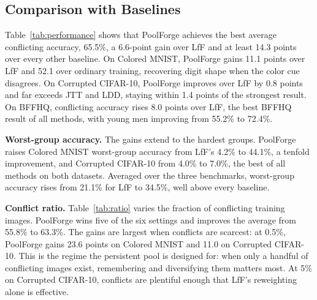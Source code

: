 \documentclass[10pt,twocolumn,letterpaper]{article}
\begin{document}
\subsection{Comparison with Baselines}

Table~\ref{tab:performance} shows that PoolForge achieves the best average conflicting accuracy, 65.5\%, a 6.6-point gain over LfF and at least 14.3 points over every other baseline. On Colored MNIST, PoolForge gains 11.1 points over LfF and 52.1 over ordinary training, recovering digit shape when the color cue disagrees. On Corrupted CIFAR-10, PoolForge improves over LfF by 0.8 points and far exceeds JTT and LDD, staying within 1.4 points of the strongest result. On BFFHQ, conflicting accuracy rises 8.0 points over LfF, the best BFFHQ result of all methods, with young men improving from 55.2\% to 72.4\%.

\begin{table}[t]
\centering\small\setlength{\tabcolsep}{3pt}

\caption{Conflicting accuracy (\%) per method and dataset. Higher is better. LDD uses its own backbone and training budget.}
\label{tab:performance}
\end{table}

\textbf{Worst-group accuracy.} The gains extend to the hardest groups. PoolForge raises Colored MNIST worst-group accuracy from LfF's 4.2\% to 44.1\%, a tenfold improvement, and Corrupted CIFAR-10 from 4.0\% to 7.0\%, the best of all methods on both datasets. Averaged over the three benchmarks, worst-group accuracy rises from 21.1\% for LfF to 34.5\%, well above every baseline.

\textbf{Conflict ratio.} Table~\ref{tab:ratio} varies the fraction of conflicting training images. PoolForge wins five of the six settings and improves the average from 55.8\% to 63.3\%. The gains are largest when conflicts are scarcest: at 0.5\%, PoolForge gains 23.6 points on Colored MNIST and 11.0 on Corrupted CIFAR-10. This is the regime the persistent pool is designed for: when only a handful of conflicting images exist, remembering and diversifying them matters most. At 5\% on Corrupted CIFAR-10, conflicts are plentiful enough that LfF's reweighting alone is effective.

\begin{table}[t]
\centering\small\setlength{\tabcolsep}{2.2pt}

\caption{Conflicting accuracy (\%) at different training conflict ratios.}
\label{tab:ratio}
\end{table}
\end{document}
